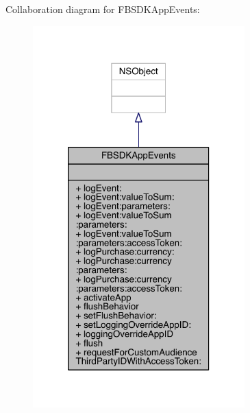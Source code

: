 Collaboration diagram for F\-B\-S\-D\-K\-App\-Events\-:
\nopagebreak
\begin{figure}[H]
\begin{center}
\leavevmode
\includegraphics[width=232pt]{interface_f_b_s_d_k_app_events__coll__graph}
\end{center}
\end{figure}
